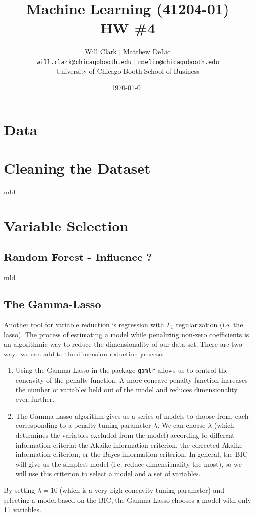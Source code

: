 \documentclass[11pt, fleqn]{article}
\begin{document}
\title{Machine Learning (41204-01)\\HW \#4}
\author{Will Clark $\vert$ Matthew DeLio \\
\texttt{will.clark@chicagobooth.edu} $\vert$ \texttt{mdelio@chicagobooth.edu} \\
University of Chicago Booth School of Business}
\date{\today}
\maketitle

\section{Data}

\section{Cleaning the Dataset}
mld
\section{Variable Selection}
\subsection{Random Forest - Influence ?}
mld

\subsection{The Gamma-Lasso}

Another tool for variable reduction is regression with $L_1$ regularization (i.e. the lasso). The process of estimating a model while penalizing non-zero coefficients is an algorithmic way to reduce the dimensionality of our data set. There are two ways we can add to the dimension reduction process:
\begin{enumerate}
\item Using the Gamma-Lasso in the package \texttt{gamlr} allows us to control the concavity of the penalty function. A more concave penalty function increases the number of variables held out of the model and reduces dimensionality even further.
\item The Gamma-Lasso algorithm gives us a series of models to choose from, each corresponding to a penalty tuning parameter $\lambda$. We can choose $\lambda$ (which determines the variables excluded from the model) according to different information criteria: the Akaike information criterion, the corrected Akaike information criterion, or the Bayes information criterion. In general, the BIC will give us the simplest model (i.e. reduce dimensionality the most), so we will use this criterion to select a model and a set of variables.
\end{enumerate}
By setting $\lambda=10$ (which is a very high concavity tuning parameter) and selecting a model based on the BIC, the Gamma-Lasso chooses a model with only 11 variables.
\end{document}
